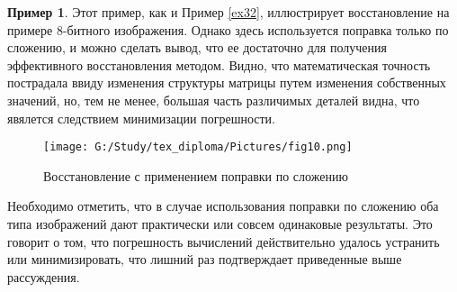 \documentclass[a4paper]{article}
\theoremstyle{definition}
\newtheorem{example}{Пример}[section]
\begin{document}
\begin{example}

Этот пример, как и Пример \autoref{ex32}, иллюстрирует восстановление на примере 8-битного изображения. Однако здесь используется поправка только по сложению, и можно сделать вывод, что ее достаточно для получения эффективного восстановления методом. Видно, что математическая точность пострадала ввиду изменения структуры матрицы путем изменения собственных значений, но, тем не менее, большая часть различимых деталей видна, что явялется следствием минимизации погрешности.

\hspace*{-\parindent}
\begin{minipage}{150mm}
  \begin{figure}[H]
            \texttt{[image: G:/Study/tex\_diploma/Pictures/fig10.png]}
            \label{Pic10}
            \caption[Восстановление с применением поправки по сложению]{Восстановление с применением поправки по сложению}
        \end{figure}
\end{minipage}
\hfill
\vspace*{2mm}

\end{example}


Необходимо отметить, что в случае использования поправки по сложению оба типа изображений дают практически или совсем одинаковые результаты. Это говорит о том, что погрешность вычислений действительно удалось устранить или минимизировать, что лишний раз подтверждает приведенные выше рассуждения.



\newpage
\end{document}
